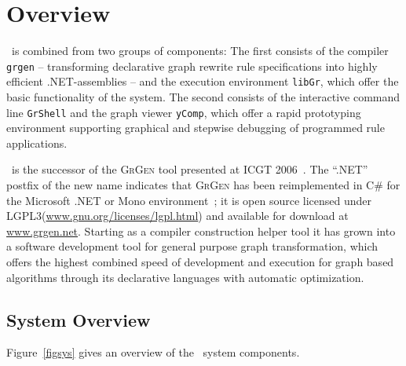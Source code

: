 \chapter{Overview}
\label{chp:overview}

\GrG\ is combined from two groups of components:
The first consists of the compiler \texttt{grgen} -- transforming declarative graph rewrite rule specifications into highly efficient .NET-assemblies --
and the execution environment \texttt{libGr}, which offer the basic functionality of the system.
The second consists of the interactive command line \texttt{GrShell} and the graph viewer \texttt{yComp},
which offer a rapid prototyping environment supporting graphical and stepwise debugging of programmed rule applications.

\GrG~is the successor of the \textsc{GrGen} tool presented at ICGT 2006~\cite{GBGHS:06}.
The ``.NET'' postfix of the new name indicates that \textsc{GrGen} has been reimplemented in C\# for the Microsoft .NET or Mono environment~\cite{NET,MONO};
it is open source licensed under LGPL3(\url{www.gnu.org/licenses/lgpl.html}) and available for download at \url{www.grgen.net}.
Starting as a compiler construction helper tool it has grown into a software development tool for general purpose graph transformation,
which offers the highest combined speed of development and execution for graph based algorithms through its declarative languages with automatic optimization.

\section{System Overview}

Figure~\ref{figsys} gives an overview of the \GrG\ system components.

